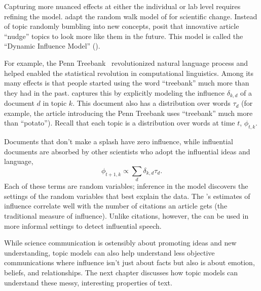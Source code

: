 Capturing more nuanced effects at either the individual or lab level requires
refining the model.  \citet{gerrish-10} adapt the random walk model of
\citet{wang-08} for scientific change.  Instead of topic randomly bumbling into
new concepts, \citet{gerrish-10} posit that innovative article ``nudge'' topics
to look more like them in the future.  This model is called the ``Dynamic
Influence Model'' ().

For example, the Penn Treebank~\citep{marcus-93} revolutionized natural language
process and helped enabled the statistical revolution in computational
linguistics.  Among its many effects is that people started using the word
``treebank'' much more than they had in the past.   captures this by
explicitly modeling the influence $\delta_{k,d}$ of a document $d$ in topic
$k$.  This document also has a distribution over words $\tau_d$ (for example, the article
introducing the Penn Treebank uses ``treebank'' much more than ``potato'').
Recall that each topic is a distribution over words at time $t$, $\phi_{t,k}$.

Documents that don't make a splash have zero influence, while influential
documents are absorbed by other scientists who adopt the influential ideas and
language,
\begin{equation}
  \phi_{t+1,k} \propto \sum_d \delta_{k,d} \tau_d.
\end{equation}
Each of these terms are random variables; inference in the model discovers the
settings of the random variables that best explain the data.  The 's
estimates of influence correlate well with the number of citations an article
gets (the traditional measure of influence).  Unlike citations, however, the
 can be used in more informal settings to detect influential speech.

While science communication is ostensibly about promoting ideas and new
understanding, topic models can also help understand less objective
communications where influence isn't just about facts but also is about emotion,
beliefs, and relationships.  The next chapter discusses how topic models can
understand these messy, interesting properties of text.
